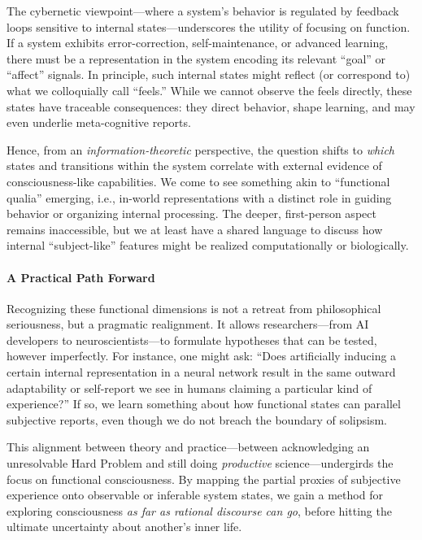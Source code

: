 \documentclass[12pt,letterpaper]{article}
\begin{document}
The cybernetic viewpoint---where a system's behavior is regulated by feedback loops sensitive to internal states---underscores the utility of focusing on function. If a system exhibits error-correction, self-maintenance, or advanced learning, there must be a representation in the system encoding its relevant ``goal'' or ``affect'' signals. In principle, such internal states might reflect (or correspond to) what we colloquially call ``feels.'' While we cannot observe the feels directly, these states have traceable consequences: they direct behavior, shape learning, and may even underlie meta-cognitive reports.

Hence, from an \textit{information-theoretic} perspective, the question shifts to \textit{which} states and transitions within the system correlate with external evidence of consciousness-like capabilities. We come to see something akin to ``functional qualia'' emerging, i.e., in-world representations with a distinct role in guiding behavior or organizing internal processing. The deeper, first-person aspect remains inaccessible, but we at least have a shared language to discuss how internal ``subject-like'' features might be realized computationally or biologically.

\paragraph{A Practical Path Forward}

Recognizing these functional dimensions is not a retreat from philosophical seriousness, but a pragmatic realignment. It allows researchers---from AI developers to neuroscientists---to formulate hypotheses that can be tested, however imperfectly. For instance, one might ask: ``Does artificially inducing a certain internal representation in a neural network result in the same outward adaptability or self-report we see in humans claiming a particular kind of experience?'' If so, we learn something about how functional states can parallel subjective reports, even though we do not breach the boundary of solipsism.

This alignment between theory and practice---between acknowledging an unresolvable Hard Problem and still doing \textit{productive} science---undergirds the focus on functional consciousness. By mapping the partial proxies of subjective experience onto observable or inferable system states, we gain a method for exploring consciousness \textit{as far as rational discourse can go}, before hitting the ultimate uncertainty about another's inner life.
\end{document}
